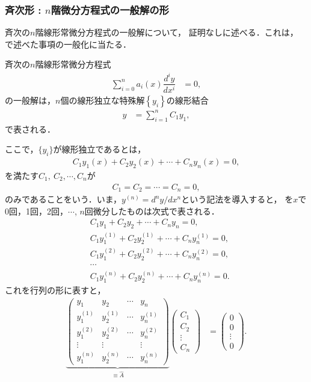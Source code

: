 \subsubsection{斉次形 : $n$階微分方程式の一般解の形}
%
斉次の$n$階線形常微分方程式の一般解について，
証明なしに述べる．これは，
で述べた事項の一般化に当たる．
%
\begin{shadebox}
 斉次の$n$階線形常微分方程式
\begin{align}
 \sum_{i=0}^{n}a_{i}\left(x\right)\dfrac{d^{i}y}{dx^{i}}& =0, 
\end{align}
の一般解は，$n$個の線形独立な特殊解$\left\{y_i\right\}$の線形結合
\begin{align}
  y & =\sum_{i=1}^{n}C_{1}y_{1},
\end{align} 
で表される．
\end{shadebox}
ここで，$\{y_i\}$が線形独立であるとは，
\begin{align}
  C_1 y_1(x) + C_2 y_2(x) + \cdots + C_n y_n (x) = 0, \label{eq:linear_independ} 
\end{align}
を満たす$C_1,~C_2,\cdots,C_n$が
\begin{align}
 C_1 = C_2 = \cdots = C_n = 0, 
\end{align}
のみであることをいう．いま，$y^{(n)}= d^n y/dx^n$という記法を導入すると，
を$x$で0回，1回，2回，$\cdots$, $n$回微分したものは次式で表される．
\begin{align}
  &C_1 y_1 + C_2 y_2 + \cdots + C_n y_n  = 0, \\ 
  &C_1 y_{1}^{(1)} + C_2 y_{2}^{(1)} + \cdots + C_n y_{n}^{(1)} = 0, \\  
  &C_1 y_{1}^{(2)} + C_2 y_{2}^{(2)} + \cdots + C_n y_{n}^{(2)} = 0, \\
  & \cdots \\ 
  &C_1 y_{1}^{(n)} + C_2 y_{2}^{(n)} + \cdots + C_n y_{n}^{(n)} = 0.
\end{align}
これを行列の形に表すと，
\begin{align}
 \underbrace{\left(\begin{array}{cccc}
y_{1} & y_{2} & \cdots & y_{n}\\
y_{1}^{\left(1\right)} & y_{2}^{\left(1\right)} & \cdots & y_{n}^{\left(1\right)}\\
y_{1}^{\left(2\right)} & y_{2}^{\left(2\right)} & \cdots & y_{n}^{\left(2\right)}\\
\vdots & \vdots &  & \vdots\\
y_{1}^{\left(n\right)} & y_{2}^{\left(n\right)} & \cdots & y_{n}^{\left(n\right)}
\end{array}\right)}_{\equiv\hat{A}}\left(\begin{array}{c}
C_{1}\\
C_{2}\\
\vdots\\
C_{n}
\end{array}\right) & =\left(\begin{array}{c}
0\\
0\\
\vdots\\
0
\end{array}\right). 
\end{align}

